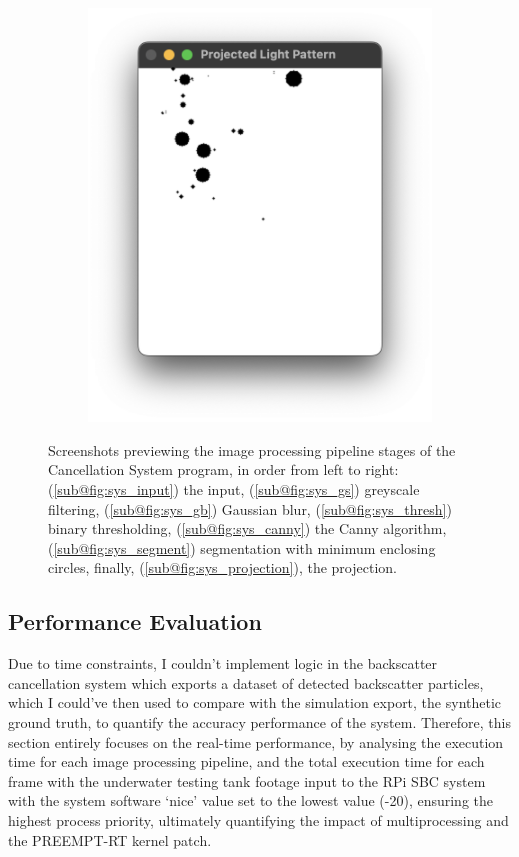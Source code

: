 \begin{figure}[H]
\begin{subfigure}{.39\textwidth}
        \includegraphics[width=1\linewidth]{assets/sys_project.png}
        \caption{}
        \label{fig:sys_projection}
    \end{subfigure}
    \caption{Screenshots previewing the image processing pipeline stages of the Cancellation System program, in order from left to right: (\ref{sub@fig:sys_input}) the input, (\ref{sub@fig:sys_gs}) greyscale filtering, (\ref{sub@fig:sys_gb}) Gaussian blur, (\ref{sub@fig:sys_thresh}) binary thresholding, (\ref{sub@fig:sys_canny}) the Canny algorithm, (\ref{sub@fig:sys_segment}) segmentation with minimum enclosing circles, finally, (\ref{sub@fig:sys_projection}), the projection.}
    \label{fig:sys_flow_visual}
\end{figure}

\subsection{Performance Evaluation}

Due to time constraints, I couldn't implement logic in the backscatter cancellation system which exports a dataset of detected backscatter particles, which I could've then used to compare with the simulation export, the synthetic ground truth, to quantify the accuracy performance of the system. Therefore, this section entirely focuses on the real-time performance, by analysing the execution time for each image processing pipeline, and the total execution time for each frame with the underwater testing tank footage input to the RPi SBC system with the system software `nice' value set to the lowest value (-20), ensuring the highest process priority, ultimately quantifying the impact of multiprocessing and the PREEMPT-RT kernel patch.

